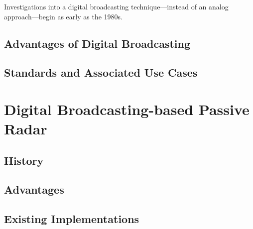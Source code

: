\documentclass[class=report,11pt,crop=false]{standalone}
\begin{document}
Investigations into a digital broadcasting technique---instead of an analog approach---begin as early as the 1980s.

\subsection{Advantages of Digital Broadcasting}
\subsection{Standards and Associated Use Cases}


\section{Digital Broadcasting-based Passive Radar}
\subsection{History}
\subsection{Advantages}
\subsection{Existing Implementations}




\ifstandalone

\printnoidxglossary[type=\acronymtype,nonumberlist]
\fi
\end{document}
